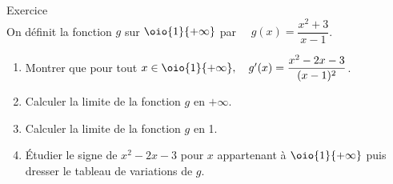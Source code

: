 \documentclass[a4paper,11pt,eval]{nsi}
\newcounter{exoNum}
\newcommand{\exo}[1]
{
	\addtocounter{exoNum}{1}
	{\titlefont\color{UGLiBlue}\Large Exercice\ \theexoNum\ \normalsize{#1}}\smallskip	
}
\begin{document}
\exo{}\\
On définit la fonction $g$ sur $\oio{1}{+\infty}$ par $\quad g(x)=\dfrac{x^2+3}{x-1}$.
\begin{enumerate}
    \item Montrer que pour tout $x\in\oio{1}{+\infty}, \quad g'(x)=\dfrac{x^2-2x-3}{(x-1)^2}$.
    \item Calculer la limite de la fonction $g$ en $+\infty$.
    \item Calculer la limite de la fonction $g$ en 1.
    \item Étudier le signe de $x^2-2x-3$ pour $x$ appartenant à $\oio{1}{+\infty}$ puis dresser le tableau de variations de $g$.
\end{enumerate}
\\
\end{document}
